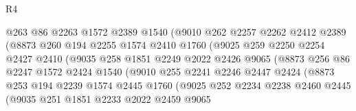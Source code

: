 \begin{lexlean}{R4}
\begin{coremodule}
                          @263
                          @86
                          @2263
                          @1572
                          @2389
                          @1540
                          (@9010
                            @262
                            @2257
                            @2262
                            @2412
                            @2389
                            (@8873
                              @260
                              @194
                              @2255
                              @1574
                              @2410
                              @1760
                              (@9025
                                @259
                                @2250
                                @2254
                                @2427
                                @2410
                                (@9035
                                  @258
                                  @1851
                                  @2249
                                  @2022
                                  @2426
                                  @9065
                                  (@8873
                                    @256
                                    @86
                                    @2247
                                    @1572
                                    @2424
                                    @1540
                                    (@9010
                                      @255
                                      @2241
                                      @2246
                                      @2447
                                      @2424
                                      (@8873
                                        @253
                                        @194
                                        @2239
                                        @1574
                                        @2445
                                        @1760
                                        (@9025
                                          @252
                                          @2234
                                          @2238
                                          @2460
                                          @2445
                                          (@9035
                                            @251
                                            @1851
                                            @2233
                                            @2022
                                            @2459
                                            @9065

\end{coremodule}
\end{lexlean}
